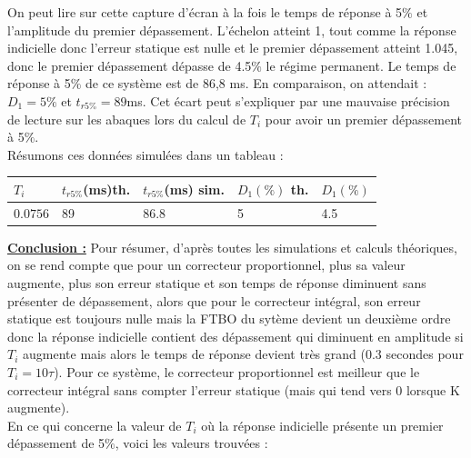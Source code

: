 \documentclass[12pt]{article}
\begin{document}
On peut lire sur cette capture d'écran à la fois le temps de réponse à 5$\%$ et l'amplitude du premier dépassement. L'échelon atteint 1, tout comme la réponse indicielle donc l'erreur statique est nulle et le premier dépassement atteint 1.045, donc le premier dépassement dépasse de 4.5$\%$ le régime permanent. Le temps de réponse à 5$\%$ de ce système est de 86,8 ms.
En comparaison, on attendait : $D_1 = 5\%$ et $t_{r5\%} = 89$ms. Cet écart peut s'expliquer par une mauvaise précision de lecture sur les abaques lors du calcul de $T_i$ pour avoir un premier dépassement à 5$\%$.
\\Résumons ces données simulées dans un tableau : 
\begin{center}
    \begin{tabular}{ |p{1cm}|p{2.5cm}|p{2.5cm}|p{2.5cm}|p{2.5cm}|}

        \hline
        $T_i$ & $t_{r5\%}$(ms)th.& $t_{r5\%}$(ms) sim. &$D_1 (\%)$ th. & $D_1 (\%) $ \\
        \hline
        $0.0756$& 89 & 86.8 & 5 & 4.5  \\
        \hline
        \end{tabular}
    \end{center}

\underline{\bf Conclusion :} Pour résumer, d'après toutes les simulations et calculs théoriques, on se rend compte que pour un correcteur proportionnel, plus sa valeur augmente, plus son erreur statique et son temps de réponse diminuent sans présenter de dépassement, alors que pour le correcteur intégral, son erreur statique est toujours nulle mais la FTBO du sytème devient un deuxième ordre donc la réponse indicielle contient des dépassement qui diminuent en amplitude si $T_i$ augmente mais alors le temps de réponse devient très grand (0.3 secondes pour $T_i = 10\tau$). Pour ce système, le correcteur proportionnel est meilleur que le correcteur intégral sans compter l'erreur statique (mais qui tend vers 0 lorsque K augmente). 
\\En ce qui concerne la valeur de $T_i$ où la réponse indicielle présente un premier dépassement de 5$\%$, voici les valeurs trouvées : 
\end{document}
